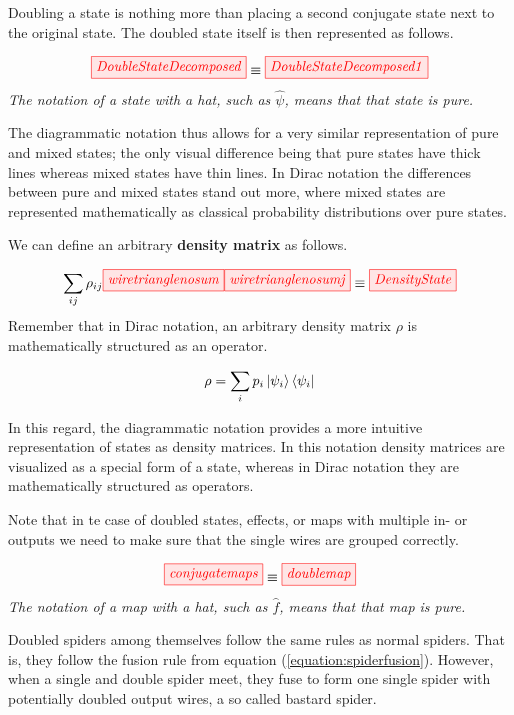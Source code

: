 \documentclass[]{article}
\begin{document}
Doubling a state is nothing more than placing a second conjugate state
next to the original state. The doubled state itself is then represented as follows.

\begin{equation}
	\label{equation:doubledstate}
	\tikzfig{DoubleStateDecomposed} \equiv \tikzfig{DoubleStateDecomposed1}
\end{equation}
\textit{The notation of a state with a hat, such as $\hat{\psi}$, means that that state is pure.}

The diagrammatic notation thus allows for a very similar representation of pure and mixed states; the only visual difference being that pure states have thick lines whereas mixed states have thin lines. In Dirac notation the differences between pure and mixed states stand out more, where mixed states are represented mathematically as classical probability distributions over pure states.

We can define an arbitrary \textbf{density matrix} as follows.

\begin{equation}
	\label{equation:densitymatrix}
	 \sum\limits_{ij} \rho_{ij} \tikzfig{wiretrianglenosum} \tikzfig{wiretrianglenosumj} \equiv \tikzfig{DensityState}
\end{equation}
\newpage
Remember that in Dirac notation, an arbitrary density matrix $\rho$ is mathematically structured as an operator. 

\begin{equation}
	\label{equation:densityoperator}
	\rho = \sum\limits_{i}p_i \ket{\psi_i}\bra{\psi_i}
\end{equation}

In this regard, the diagrammatic notation provides a more intuitive representation of states as density matrices. In this notation density matrices are visualized as a special form of a state, whereas in Dirac notation they are mathematically structured as operators.

Note that in te case of doubled states, effects, or maps with multiple in- or outputs we need to make sure that the single wires are grouped correctly.

\begin{equation}
\label{equation:conjugatemaps}
\tikzfig{conjugatemaps} \equiv \tikzfig{doublemap}
\end{equation}
\textit{The notation of a map with a hat, such as $\hat{f}$, means that that map is pure.}

Doubled spiders among themselves follow the same rules as normal spiders. That is, they follow the fusion rule from equation (\ref{equation:spiderfusion}). However, when a single and double spider meet, they fuse to form one single spider with potentially doubled output wires, a so called bastard spider.
\end{document}
